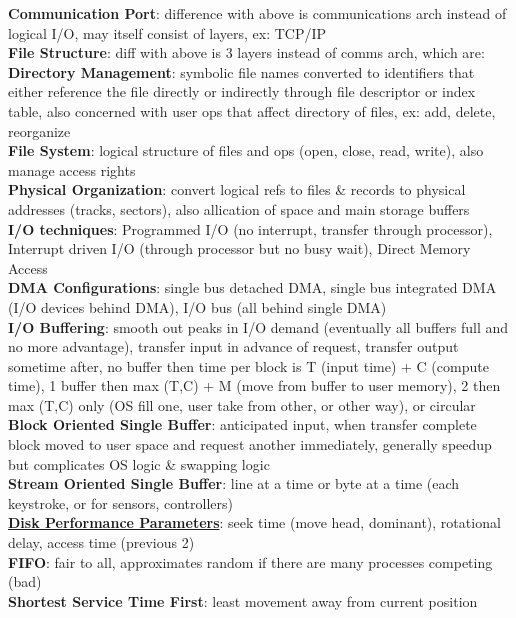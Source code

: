 \documentclass[a4paper]{article}
\begin{document}
\begin{multicols}{2}
        \textbf{Communication Port}: difference with above is communications arch instead of logical I/O, may itself consist of layers, ex: TCP/IP\\
        \textbf{File Structure}: diff with above is 3 layers instead of comms arch, which are:\\
        \textbf{Directory Management}: symbolic file names converted to identifiers that either reference the file directly or indirectly through file descriptor or index table, also concerned with user ops that affect directory of files, ex: add, delete, reorganize\\
        \textbf{File System}: logical structure of files and ops (open, close, read, write), also manage access rights\\
        \textbf{Physical Organization}: convert logical refs to files \& records to physical addresses (tracks, sectors), also allication of space and main storage buffers\\
        \textbf{I/O techniques}: Programmed I/O (no interrupt, transfer through processor), Interrupt driven I/O (through processor but no busy wait), Direct Memory Access\\
        \textbf{DMA Configurations}: single bus detached DMA, single bus integrated DMA (I/O devices behind DMA), I/O bus (all behind single DMA)\\
        \textbf{I/O Buffering}: smooth out peaks in I/O demand (eventually all buffers full and no more advantage), transfer input in advance of request, transfer output sometime after, no buffer then time per block is T (input time) + C (compute time), 1 buffer then max (T,C) + M (move from buffer to user memory), 2 then max (T,C) only (OS fill one, user take from other, or other way), or circular\\
        \textbf{Block Oriented Single Buffer}: anticipated input, when transfer complete block moved to user space and request another immediately, generally speedup but complicates OS logic \& swapping logic\\
        \textbf{Stream Oriented Single Buffer}: line at a time or byte at a time (each keystroke, or for sensors, controllers)\\
        \underline{\textbf{Disk Performance Parameters}}: seek time (move head, dominant), rotational delay, access time (previous 2)\\
        \textbf{FIFO}: fair to all, approximates random if there are many processes competing (bad)\\
        \textbf{Shortest Service Time First}: least movement away from current position\\

\end{multicols}
\end{document}

